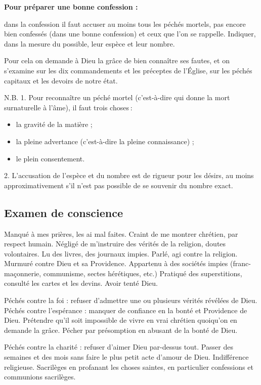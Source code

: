 \smallskip
\textbf{Pour préparer une bonne confession :}

dans la confession il faut accuser au moins tous les péchés mortels, pas encore bien confessés (dans une bonne confession) et ceux que l’on se rappelle. Indiquer, dans la mesure du possible, leur espèce et leur nombre.

Pour cela on demande à Dieu la grâce de bien connaître ses fautes, et on s’examine sur les dix commandements et les préceptes de l’Église, sur les péchés capitaux et les devoirs de notre état.

N.B. 1. Pour reconnaître un péché mortel (c’est-à-dire qui donne la mort surnaturelle à l’âme), il faut trois choses :
\begin{itemize}
\item la gravité de la matière ;
\item la pleine advertance (c’est-à-dire la pleine connaissance) ;
\item le plein consentement.
\end{itemize}

2. L’accusation de l’espèce et du nombre est de rigueur pour les désirs, au moins approximativement s'il n'est pas possible de se souvenir du nombre exact.


\subsection*{Examen de conscience}



Manqué à mes prières, les ai mal faites.
Craint de me montrer chrétien, par respect humain. Négligé de m’instruire des
vérités de la religion, doutes volontaires.
Lu des livres, des journaux impies. Parlé,
agi contre la religion. Murmuré contre
Dieu et sa Providence. Appartenu à des
sociétés impies (franc-maçonnerie, communisme, sectes hérétiques, etc.) Pratiqué
des superstitions, consulté les cartes et les
devins. Avoir tenté Dieu.

Péchés contre la foi : refuser d’admettre
une ou plusieurs vérités révélées de Dieu.
Péchés contre l’espérance : manquer de
confiance en la bonté et Providence de
Dieu. Prétendre qu’il soit impossible de
vivre en vrai chrétien quoiqu’on en demande la grâce. Pécher par présomption
en abusant de la bonté de Dieu.

Péchés contre la charité : refuser d’aimer
Dieu par-dessus tout. Passer des semaines
et des mois sans faire le plus petit acte
d’amour de Dieu. Indifférence religieuse.
Sacrilèges en profanant les choses saintes,
en particulier confessions et communions
sacrilèges.

